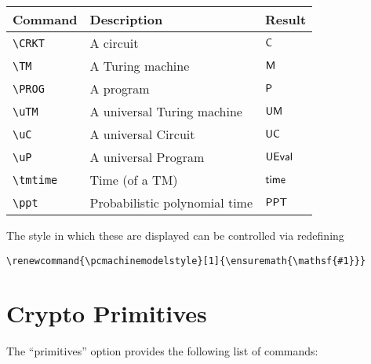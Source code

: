 \documentclass[a4paper]{report}
\begin{document}
\begin{center}
\begin{tabular}{l l l}
\textbf{Command} & \textbf{Description} & \textbf{Result} \\\hline
\lstinline$\CRKT$ & A circuit & $\CRKT$  \\
\lstinline$\TM$ & A Turing machine & $\TM$  \\
\lstinline$\PROG$ & A program & $\PROG$  \\
\lstinline$\uTM$ & A universal Turing machine & $\uTM$  \\
\lstinline$\uC$ & A universal Circuit & $\uC$  \\
\lstinline$\uP$ & A universal Program & $\uP$  \\
\lstinline$\tmtime$ & Time (of a TM) & $\tmtime$  \\
\lstinline$\ppt$ & Probabilistic polynomial time & $\mathsf{PPT}$  
\end{tabular}
\end{center}

The style in which these are displayed can be controlled via redefining
\begin{lstlisting}
\renewcommand{\pcmachinemodelstyle}[1]{\ensuremath{\mathsf{#1}}}
\end{lstlisting}

\section{Crypto Primitives}
The \enquote{primitives} option provides the following list of commands:
\end{document}

